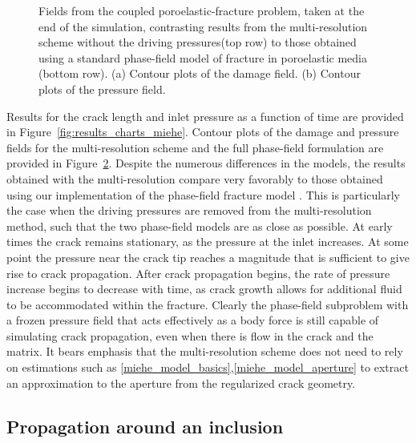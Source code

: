 \begin{figure}
\begin{subfigure}{.5\textwidth}
  \caption{}
  \label{fig:pressure_snapshot_p2}
\end{subfigure}
  \caption{Fields from the coupled poroelastic-fracture problem, taken at the end of the simulation, contrasting results from the multi-resolution scheme without the driving pressures(top row) to those obtained using a standard phase-field model of fracture in poroelastic media (bottom row).  (a) Contour plots of the damage field.   (b) Contour plots of the pressure field.}
  \label{fig:results_fields_miehe}
\end{figure}

Results for the crack length and inlet pressure as a function of time are provided in Figure~\ref{fig:results_charts_miehe}. Contour plots of the damage and pressure fields for the multi-resolution scheme and the full phase-field formulation are provided in Figure~\ref{fig:results_fields_miehe}.
Despite the numerous differences in the models, the results obtained with the multi-resolution compare very favorably to those obtained using our implementation of the phase-field fracture model \cite{miehe2016phase}.  This is particularly the case when the driving pressures are removed from the multi-resolution method, such that the two phase-field models are as close as possible.    At early times the crack remains stationary, as the pressure at the inlet increases.  At some point the pressure near the crack tip reaches a magnitude that is sufficient to give rise to crack propagation.  After crack propagation begins, the rate of pressure increase begins to decrease with time, as crack growth allows for additional fluid to be accommodated within the fracture. Clearly the phase-field subproblem with a frozen pressure field that acts effectively as a body force is still capable of simulating crack propagation, even when there is flow in the crack and the matrix. It bears emphasis that the multi-resolution scheme does not need to rely on estimations such as \ref{miehe_model_basics},\ref{miehe_model_aperture} to extract an approximation to the aperture from the regularized crack geometry.  

\subsection{Propagation around an inclusion }

